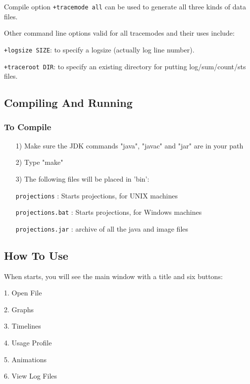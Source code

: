 Compile option {\tt +tracemode all} can be used to generate all three kinds
of data files.

Other command line options valid for all tracemodes and their uses include:

{\tt +logsize SIZE}: to specify a logsize (actually log line number).

{\tt +traceroot DIR}: to specify an existing directory for putting log/sum/count/sts
files.


\subsection{Compiling And Running \projections{}}

\subsubsection{To Compile \projections{}}
\begin{enumerate}
\item[1)]
   Make sure the JDK commands "java", "javac" and "jar"
   are in your path
\item[2)]
   Type "make"
\item[3)]
   The following files will be placed in 'bin':

      {\tt projections}           : Starts projections, for UNIX machines

      {\tt projections.bat}       : Starts projections, for Windows machines

      {\tt projections.jar}       : archive of all the java and image files
\end{enumerate}

\subsection{How To Use \projections{}}
When \projections{} starts, you will see the main window with a title and
six buttons:

1. Open File

2. Graphs

3. Timelines

4. Usage Profile

5. Animations

6. View Log Files

